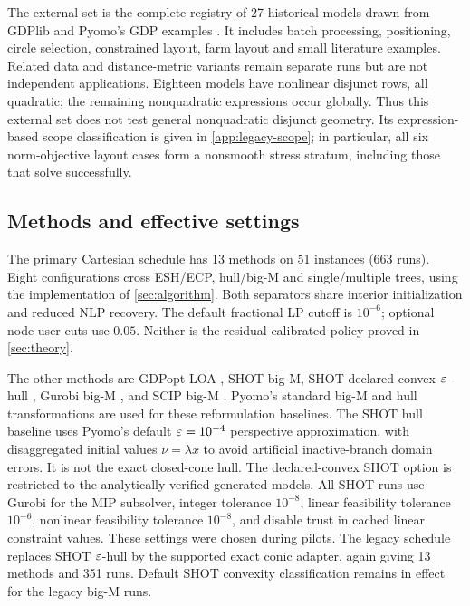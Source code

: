 The external set is the complete registry of 27 historical models drawn from GDPlib and Pyomo's GDP examples \citep{gdplib,pyomoexamples}. It includes batch processing, positioning, circle selection, constrained layout, farm layout and small literature examples. Related data and distance-metric variants remain separate runs but are not independent applications. Eighteen models have nonlinear disjunct rows, all quadratic; the remaining nonquadratic expressions occur globally. Thus this external set does not test general nonquadratic disjunct geometry. Its expression-based scope classification is given in \cref{app:legacy-scope}; in particular, all six norm-objective layout cases form a nonsmooth stress stratum, including those that solve successfully.

\subsection{Methods and effective settings}\label{sec:settings}
The primary Cartesian schedule has 13 methods on 51 instances (663 runs). Eight configurations cross ESH/ECP, hull/big-M and single/multiple trees, using the implementation of \cref{sec:algorithm}. Both separators share interior initialization and reduced NLP recovery. The default fractional LP cutoff is $10^{-6}$; optional node user cuts use $0.05$. Neither is the residual-calibrated policy proved in \cref{sec:theory}.

The other methods are GDPopt LOA \citep{chen2018}, SHOT big-M, SHOT declared-convex $\varepsilon$-hull \citep{lundell2022}, Gurobi big-M \citep{gurobi}, and SCIP big-M \citep{scip10}. Pyomo's standard big-M and hull transformations are used for these reformulation baselines. The SHOT hull baseline uses Pyomo's default $\varepsilon=10^{-4}$ perspective approximation, with disaggregated initial values $\nu=\lambda x$ to avoid artificial inactive-branch domain errors. It is not the exact closed-cone hull. The declared-convex SHOT option is restricted to the analytically verified generated models. All SHOT runs use Gurobi for the MIP subsolver, integer tolerance $10^{-8}$, linear feasibility tolerance $10^{-6}$, nonlinear feasibility tolerance $10^{-8}$, and disable trust in cached linear constraint values. These settings were chosen during pilots. The legacy schedule replaces SHOT $\varepsilon$-hull by the supported exact conic adapter, again giving 13 methods and 351 runs. Default SHOT convexity classification remains in effect for the legacy big-M runs.


